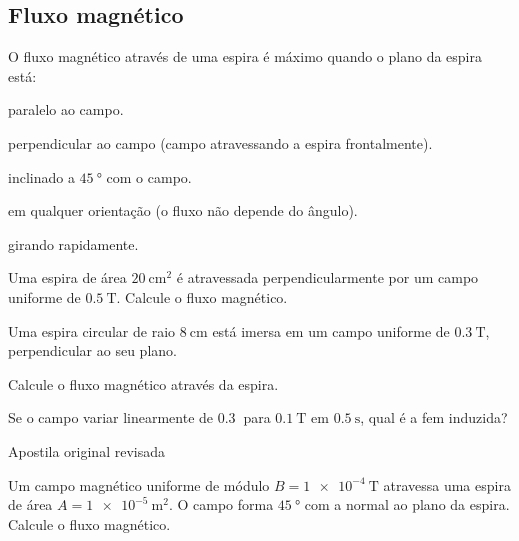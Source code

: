 
\subsection{Fluxo magnético}

\blocofixacao
\begin{questao}[1]{}

O fluxo magnético através de uma espira é máximo quando o plano da espira está:
\begin{alternativas}
\item paralelo ao campo.
\item perpendicular ao campo (campo atravessando a espira frontalmente).
\item inclinado a $\SI{45}{\degree}$ com o campo.
\item em qualquer orientação (o fluxo não depende do ângulo).
\item girando rapidamente.
\end{alternativas}


\end{questao}
\begin{questao}[1]{}

Uma espira de área $\SI{20}{\centi\meter\squared}$ é atravessada
perpendicularmente por um campo uniforme de $\SI{0.5}{\tesla}$. Calcule o fluxo
magnético.


\end{questao}

\blocoaplicacao
\begin{questao}[2]{}

Uma espira circular de raio $\SI{8}{\centi\meter}$ está imersa em um campo
uniforme de $\SI{0.3}{\tesla}$, perpendicular ao seu plano.
\begin{itensq}
\item Calcule o fluxo magnético através da espira.
\item Se o campo variar linearmente de $\SI{0.3}{}$ para $\SI{0.1}{\tesla}$ em
      $\SI{0.5}{\second}$, qual é a fem induzida?
\end{itensq}


\end{questao}
\begin{questao}[2]{Apostila original revisada}

Um campo magnético uniforme de módulo $B=\SI{1e-4}{\tesla}$ atravessa uma espira de
área $A=\SI{1e-5}{\metre\squared}$. O campo forma $\SI{45}{\degree}$ com a normal
ao plano da espira. Calcule o fluxo magnético.


\end{questao}


